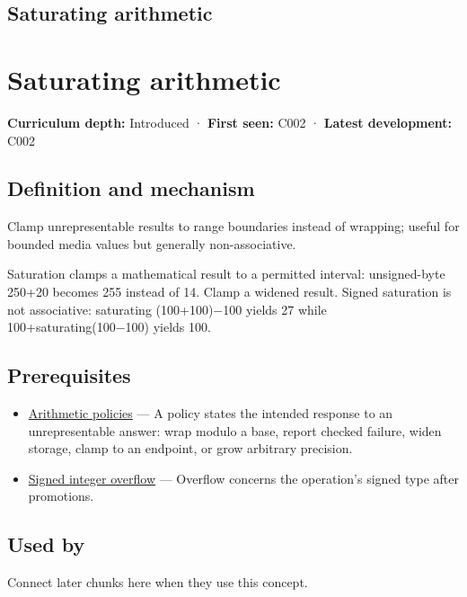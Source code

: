 \hypertarget{appendix-3999c6209649}{}
\section*{Saturating arithmetic}
\chapter{Saturating arithmetic}\label{appendix-3999c6209649-saturating-arithmetic}

\textbf{Curriculum depth:} Introduced · \textbf{First seen:} C002 · \textbf{Latest development:} C002

\section{Definition and mechanism}\label{appendix-3999c6209649-definition-and-mechanism}

Clamp unrepresentable results to range boundaries instead of wrapping; useful for bounded media values but generally non-associative.

Saturation clamps a mathematical result to a permitted interval: unsigned-byte 250+20 becomes 255 instead of 14. Clamp a widened result. Signed saturation is not associative: saturating (100+100)−100 yields 27 while 100+saturating(100−100) yields 100.

\section{Prerequisites}\label{appendix-3999c6209649-prerequisites}

\begin{itemize}
\tightlist
\item
  \hyperref[appendix-2ed044358b82]{Arithmetic policies} --- A policy states the intended response to an unrepresentable answer: wrap modulo a base, report checked failure, widen storage, clamp to an endpoint, or grow arbitrary precision.
\item
  \hyperref[appendix-1a599c924a4e]{Signed integer overflow} --- Overflow concerns the operation's signed type after promotions.
\end{itemize}

\section{Used by}\label{appendix-3999c6209649-used-by}

Connect later chunks here when they use this concept.


